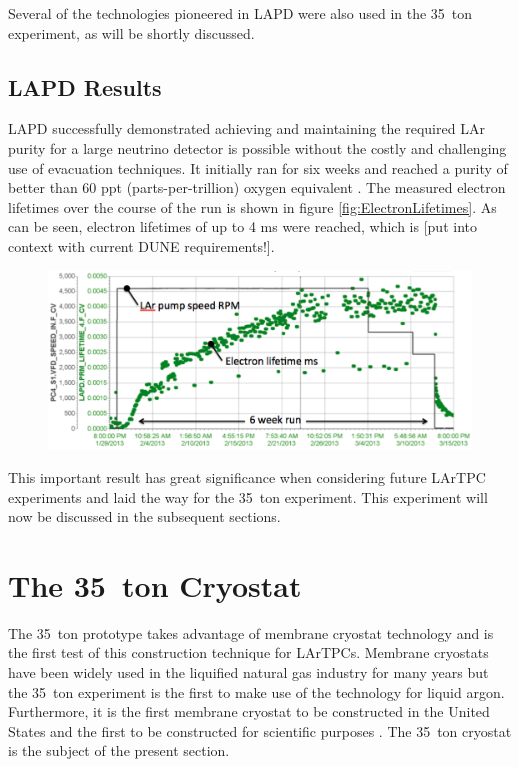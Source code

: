 Several of the technologies pioneered in LAPD were also used in the 35~ton experiment, as will be shortly discussed.

\subsection{LAPD Results}\label{sec:LAPDResults}

LAPD successfully demonstrated achieving and maintaining the required LAr purity for a large neutrino detector is possible without the costly and challenging use of evacuation techniques.  It initially ran for six weeks and reached a purity of better than 60 ppt (parts-per-trillion) oxygen equivalent \cite{LAPD}.  The measured electron lifetimes over the course of the run is shown in figure \ref{fig:ElectronLifetimes}.  As can be seen, electron lifetimes of up to 4 ms were reached, which is [put into context with current DUNE requirements!].

\begin{figure}[ht]
  \centering
  \includegraphics[width=15cm]{LAPDElectronLifetime.png}
  \caption[]{}
  \label{fig:LAPDElectronLifetime}
\end{figure}

This important result has great significance when considering future LArTPC experiments and laid the way for the 35~ton experiment.  This experiment will now be discussed in the subsequent sections.

\section{The 35~ton Cryostat}\label{sec:35tonCryostat}

The 35~ton prototype takes advantage of membrane cryostat technology and is the first test of this construction technique for LArTPCs.  Membrane cryostats have been widely used in the liquified natural gas industry for many years but the 35~ton experiment is the first to make use of the technology for liquid argon.  Furthermore, it is the first membrane cryostat to be constructed in the United States and the first to be constructed for scientific purposes \cite{LBNE35tonPhaseIOverview}.  The 35~ton cryostat is the subject of the present section.

